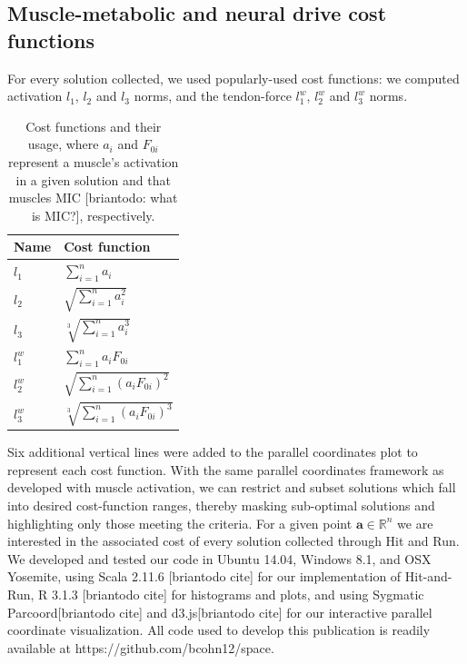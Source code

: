 \subsection{Muscle-metabolic and neural drive cost functions}

For every solution collected, we used popularly-used cost functions: we computed activation $l_1$, $l_2$ and $l_3$ norms, and the tendon-force $l_1^w$, $l_2^w$ and $l_3^w$ norms.


\begin{table}[h]
\centering
\begin{tabular}{@{}ll@{}}
\toprule
\textbf{Name} & \textbf{Cost function}  \\ \midrule
$l_1$            & $\sum_{i=1}^n a_i$                                     \\
$l_2$            & $\sqrt{\sum_{i=1}^n a_i^2}$                                    \\
$l_3$            & $\sqrt[3]{\sum_{i=1}^n a_i^3}$                                   \\
$l_1^w$            & $\sum_{i=1}^n a_i F_{0i}$                                    \\
$l_2^w$            & $\sqrt{\sum_{i=1}^n (a_i F_{0i})^2}$                                  \\
$l_3^w$            & $\sqrt[3]{\sum_{i=1}^n (a_i F_{0i})^3}$                                    \\ \bottomrule
\end{tabular}
\caption{Cost functions and their usage, where $a_i$ and $F_{0i}$ represent a muscle's activation in a given solution and that muscles MIC [briantodo: what is MIC?], respectively.}
\label{cost_function_tabls}
\end{table}

Six additional vertical lines were added to the parallel coordinates plot to represent each cost function. With the same parallel coordinates framework as developed with muscle activation, we can restrict and subset solutions which fall into desired cost-function ranges, thereby masking sub-optimal solutions and highlighting only those meeting the criteria.
For a given point $\textbf{a} \in \mathbb{R}^n$ we are interested in the associated cost of every solution collected through Hit and Run.
We developed and tested our code in  Ubuntu 14.04, Windows 8.1, and OSX Yosemite, using Scala 2.11.6 [briantodo cite] for our implementation of Hit-and-Run, R 3.1.3 [briantodo cite] for histograms and plots, and using Sygmatic Parcoord[briantodo cite] and d3.js[briantodo cite] for our interactive parallel coordinate visualization. All code used to develop this publication is readily available at https://github.com/bcohn12/space.